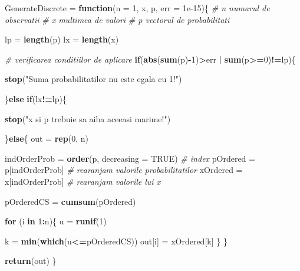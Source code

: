 \documentclass[]{article}
\newenvironment{Shaded}{\begin{snugshade}}{\end{snugshade}}
\newcommand{\KeywordTok}[1]{\textcolor[rgb]{0.13,0.29,0.53}{\textbf{#1}}}
\newcommand{\DataTypeTok}[1]{\textcolor[rgb]{0.13,0.29,0.53}{#1}}
\newcommand{\DecValTok}[1]{\textcolor[rgb]{0.00,0.00,0.81}{#1}}
\newcommand{\FloatTok}[1]{\textcolor[rgb]{0.00,0.00,0.81}{#1}}
\newcommand{\StringTok}[1]{\textcolor[rgb]{0.31,0.60,0.02}{#1}}
\newcommand{\CommentTok}[1]{\textcolor[rgb]{0.56,0.35,0.01}{\textit{#1}}}
\newcommand{\OtherTok}[1]{\textcolor[rgb]{0.56,0.35,0.01}{#1}}
\newcommand{\ControlFlowTok}[1]{\textcolor[rgb]{0.13,0.29,0.53}{\textbf{#1}}}
\newcommand{\OperatorTok}[1]{\textcolor[rgb]{0.81,0.36,0.00}{\textbf{#1}}}
\newcommand{\NormalTok}[1]{#1}
\begin{document}
\begin{Shaded}
\begin{Highlighting}[]
\NormalTok{GenerateDiscrete =}\StringTok{ }\ControlFlowTok{function}\NormalTok{(}\DataTypeTok{n =} \DecValTok{1}\NormalTok{, x, p, }\DataTypeTok{err =} \FloatTok{1e-15}\NormalTok{)\{}
  \CommentTok{# n numarul de observatii}
  \CommentTok{# x multimea de valori}
  \CommentTok{# p vectorul de probabilitati}
  
\NormalTok{  lp =}\StringTok{ }\KeywordTok{length}\NormalTok{(p)}
\NormalTok{  lx =}\StringTok{ }\KeywordTok{length}\NormalTok{(x)}
  
  \CommentTok{# verificarea conditiilor de aplicare }
  \ControlFlowTok{if}\NormalTok{(}\KeywordTok{abs}\NormalTok{(}\KeywordTok{sum}\NormalTok{(p)}\OperatorTok{-}\DecValTok{1}\NormalTok{)}\OperatorTok{>}\NormalTok{err }\OperatorTok{|}\StringTok{ }\KeywordTok{sum}\NormalTok{(p}\OperatorTok{>=}\DecValTok{0}\NormalTok{)}\OperatorTok{!=}\NormalTok{lp)\{}
    
    \KeywordTok{stop}\NormalTok{(}\StringTok{"Suma probabilitatilor nu este egala cu 1!"}\NormalTok{)}
    
\NormalTok{  \}}\ControlFlowTok{else} \ControlFlowTok{if}\NormalTok{(lx}\OperatorTok{!=}\NormalTok{lp)\{}
    
    \KeywordTok{stop}\NormalTok{(}\StringTok{"x si p trebuie sa aiba aceeasi marime!"}\NormalTok{)}
    
\NormalTok{  \}}\ControlFlowTok{else}\NormalTok{\{}
\NormalTok{    out =}\StringTok{ }\KeywordTok{rep}\NormalTok{(}\DecValTok{0}\NormalTok{, n)}
    
\NormalTok{    indOrderProb =}\StringTok{ }\KeywordTok{order}\NormalTok{(p, }\DataTypeTok{decreasing =} \OtherTok{TRUE}\NormalTok{) }\CommentTok{# index}
\NormalTok{    pOrdered =}\StringTok{ }\NormalTok{p[indOrderProb] }\CommentTok{# rearanjam valorile probabilitatilor}
\NormalTok{    xOrdered =}\StringTok{ }\NormalTok{x[indOrderProb] }\CommentTok{# rearanjam valorile lui x}
    
\NormalTok{    pOrderedCS =}\StringTok{ }\KeywordTok{cumsum}\NormalTok{(pOrdered)}
    
    \ControlFlowTok{for}\NormalTok{ (i }\ControlFlowTok{in} \DecValTok{1}\OperatorTok{:}\NormalTok{n)\{}
\NormalTok{      u =}\StringTok{ }\KeywordTok{runif}\NormalTok{(}\DecValTok{1}\NormalTok{)}
      
\NormalTok{      k =}\StringTok{ }\KeywordTok{min}\NormalTok{(}\KeywordTok{which}\NormalTok{(u}\OperatorTok{<=}\NormalTok{pOrderedCS))}
\NormalTok{      out[i] =}\StringTok{ }\NormalTok{xOrdered[k]}
\NormalTok{    \}}
\NormalTok{  \}}
  
  \KeywordTok{return}\NormalTok{(out)}
\NormalTok{\}}
\end{Highlighting}
\end{Shaded}
\end{document}
